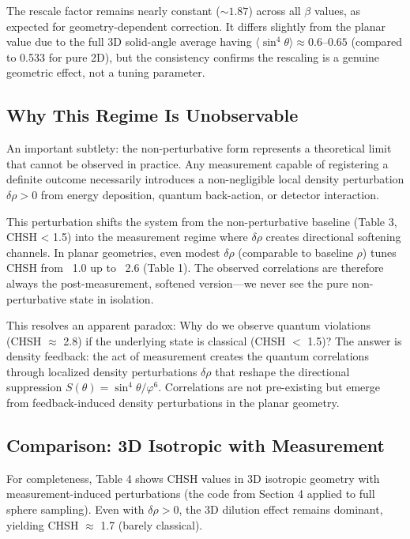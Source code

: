 \documentclass[11pt,a4paper]{article}
\theoremstyle{definition}
\theoremstyle{remark}
\newcommand{\vp}{\varphi}
\begin{document}
The rescale factor remains nearly constant ($\sim 1.87$) across all $\beta$ values, as expected for geometry-dependent correction. It differs slightly from the planar value due to the full 3D solid-angle average having $\langle \sin^4\theta \rangle \approx 0.6$--$0.65$ (compared to 0.533 for pure 2D), but the consistency confirms the rescaling is a genuine geometric effect, not a tuning parameter.

\subsection{Why This Regime Is Unobservable}

An important subtlety: the non-perturbative form represents a theoretical limit that cannot be observed in practice. Any measurement capable of registering a definite outcome necessarily introduces a non-negligible local density perturbation $\delta\rho > 0$ from energy deposition, quantum back-action, or detector interaction.

This perturbation shifts the system from the non-perturbative baseline (Table 3, CHSH < 1.5) into the measurement regime where $\delta\rho$ creates directional softening channels. In planar geometries, even modest $\delta\rho$ (comparable to baseline $\rho$) tunes CHSH from ~1.0 up to ~2.6 (Table 1). The observed correlations are therefore always the post-measurement, softened version---we never see the pure non-perturbative state in isolation.

This resolves an apparent paradox: Why do we observe quantum violations (CHSH $\approx$ 2.8) if the underlying state is classical (CHSH $<$ 1.5)? The answer is density feedback: the act of measurement creates the quantum correlations through localized density perturbations $\delta\rho$ that reshape the directional suppression $S(\theta)=\sin^4\!\theta/\vp^6$. Correlations are not pre-existing but emerge from feedback-induced density perturbations in the planar geometry.

\subsection{Comparison: 3D Isotropic with Measurement}

For completeness, Table 4 shows CHSH values in 3D isotropic geometry with measurement-induced perturbations (the code from Section 4 applied to full sphere sampling). Even with $\delta\rho > 0$, the 3D dilution effect remains dominant, yielding CHSH $\approx$ 1.7 (barely classical).
\end{document}
